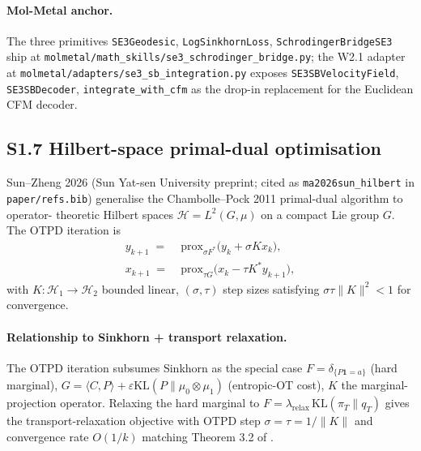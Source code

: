 \paragraph{Mol-Metal anchor.}
The three primitives \texttt{SE3Geodesic}, \texttt{LogSinkhornLoss},
\texttt{SchrodingerBridgeSE3} ship at
\texttt{molmetal/math\_skills/se3\_schrodinger\_bridge.py}; the
W2.1 adapter at \texttt{molmetal/adapters/se3\_sb\_integration.py}
exposes \texttt{SE3SBVelocityField}, \texttt{SE3SBDecoder},
\texttt{integrate\_with\_cfm} as the drop-in replacement for the
Euclidean CFM decoder.

\subsection*{S1.7 Hilbert-space primal-dual optimisation}
\label{supp:s1-hilbert}

Sun--Zheng 2026 (Sun Yat-sen University preprint; cited as
\texttt{ma2026sun\_hilbert} in \texttt{paper/refs.bib}) generalise
the Chambolle--Pock 2011 primal-dual algorithm to operator-
theoretic Hilbert spaces $\mathcal{H} = L^{2}(G, \mu)$ on a
compact Lie group $G$.  The OTPD iteration is
\begin{equation}
  \label{eq:otpd-iter}
  \begin{aligned}
    y_{k+1} \;=\; &\mathrm{prox}_{\sigma F^{\ast}}\!\bigl(
                  y_{k} + \sigma K x_{k} \bigr), \\
    x_{k+1} \;=\; &\mathrm{prox}_{\tau G}\!\bigl(
                  x_{k} - \tau K^{\ast} y_{k+1} \bigr),
  \end{aligned}
\end{equation}
with $K : \mathcal{H}_{1} \to \mathcal{H}_{2}$ bounded linear,
$(\sigma, \tau)$ step sizes satisfying $\sigma \tau \| K \|^{2} <
1$ for convergence.

\paragraph{Relationship to Sinkhorn + transport relaxation.}
The OTPD iteration subsumes Sinkhorn as the special case
$F = \delta_{\{ P \mathbf{1} = a \}}$ (hard marginal), $G = \langle
C, P \rangle + \varepsilon \mathrm{KL}(P \| \mu_{0} \otimes
\mu_{1})$ (entropic-OT cost), $K$ the marginal-projection operator.
Relaxing the hard marginal to
$F = \lambda_{\mathrm{relax}} \, \mathrm{KL}(\pi_{T} \| q_{T})$
gives the transport-relaxation objective with OTPD step
$\sigma = \tau = 1 / \|K\|$ and convergence rate $O(1/k)$
matching Theorem 3.2 of \cite{jiang2026sb_relax}.

